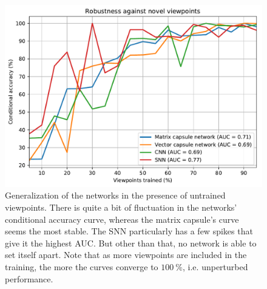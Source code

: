 \begin{figure}[H]
    \centering
\includegraphics[width=\textwidth]{figures/viewpoints.pdf}
\caption[Generalization of the networks in the presence of untrained viewpoints]{Generalization of the networks in the presence of untrained viewpoints. There is quite a bit of fluctuation in the networks' conditional accuracy curve, whereas the matrix capsule's curve seems the most stable. The SNN particularly has a few spikes that give it the highest AUC. But other than that, no network is able to set itself apart. Note that as more viewpoints are included in the training, the more the curves converge to $\SI{100}{\percent}$, i.e. unperturbed performance.}\label{fig:viewpoint-generalization}
\end{figure}\noindent